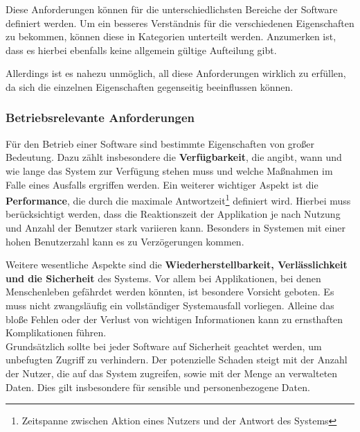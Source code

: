 Diese Anforderungen können für die unterschiedlichsten Bereiche der Software definiert werden.
Um ein besseres Verständnis für die verschiedenen Eigenschaften zu bekommen, können diese in Kategorien unterteilt werden.
Anzumerken ist, dass es hierbei ebenfalls keine allgemein gültige Aufteilung gibt. 

Allerdings ist es nahezu unmöglich, all diese Anforderungen wirklich zu erfüllen, da sich die einzelnen Eigenschaften gegenseitig beeinflussen können. \\
\cite{EA:Web04, EA:Web05} \cite[S. 55-60]{EA:Book02}


    
    \subsubsection{Betriebsrelevante Anforderungen}
    
    Für den Betrieb einer Software sind bestimmte Eigenschaften von großer Bedeutung. Dazu zählt insbesondere die \textbf{Verfügbarkeit}, die angibt, wann und wie lange das System zur Verfügung stehen muss und welche Maßnahmen im Falle eines Ausfalls ergriffen werden. Ein weiterer wichtiger Aspekt ist die \textbf{Performance}, die durch die maximale Antwortzeit\footnote{Zeitspanne zwischen Aktion eines Nutzers und der Antwort des Systems} definiert wird.
    Hierbei muss berücksichtigt werden, dass die Reaktionszeit der Applikation je nach Nutzung und Anzahl der Benutzer stark variieren kann. Besonders in Systemen mit einer hohen Benutzerzahl kann es zu Verzögerungen kommen.
    
    Weitere wesentliche Aspekte sind die \textbf{Wiederherstellbarkeit, Verlässlichkeit und die Sicherheit} des Systems.
    Vor allem bei Applikationen, bei denen Menschenleben gefährdet werden könnten, ist besondere Vorsicht geboten.
    Es muss nicht zwangsläufig ein vollständiger Systemausfall vorliegen. Alleine das bloße Fehlen oder der Verlust von wichtigen Informationen kann zu ernsthaften Komplikationen führen. \\
    Grundsätzlich sollte bei jeder Software auf Sicherheit geachtet werden, um unbefugten Zugriff zu verhindern. 
    Der potenzielle Schaden steigt mit der Anzahl der Nutzer, die auf das System zugreifen, sowie mit der Menge an verwalteten Daten. Dies gilt insbesondere für sensible und personenbezogene Daten. \\
    \cite[S. 58-59]{EA:Book02} \cite{EA:Web08}
    
